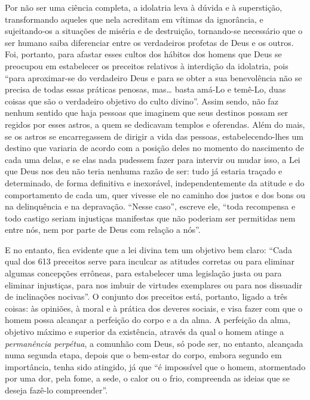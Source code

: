 Por não ser uma ciência completa, a idolatria leva à dúvida e à
superstição, transformando aqueles que nela acreditam em vítimas da
ignorância, e sujeitando-os a situações de miséria e de destruição,
tornando-se necessário que o ser humano saiba diferenciar entre os
verdadeiros profetas de Deus e os outros. Foi, portanto, para afastar
esses cultos dos hábitos dos homens que Deus se preocupou em estabelecer
os preceitos relativos à interdição da idolatria, pois ``para
aproximar-se do verdadeiro Deus e para se obter a sua benevolência não
se precisa de todas essas práticas penosas, mas\ldots{} basta amá-Lo e
temê-Lo, duas coisas que são o verdadeiro objetivo do culto divino''.
Assim sendo, não faz nenhum sentido que haja pessoas que imaginem que
seus destinos possam ser regidos por esses astros, a quem se dedicavam
templos e oferendas. Além do mais, se os astros se encarregassem de
dirigir a vida das pessoas, estabelecendo-lhes um destino que variaria
de acordo com a posição deles no momento do
nascimento de cada uma delas, e se elas nada pudessem fazer para
intervir ou mudar isso, a Lei que Deus nos deu não teria nenhuma razão
de ser: tudo já estaria traçado e determinado, de forma definitiva e
inexorável, independentemente da atitude e do comportamento de cada um,
quer vivesse ele no caminho dos justos e dos bons ou na delinquência e
na depravação. ``Nesse caso'', escreve ele, ``toda recompensa e todo
castigo seriam injustiças manifestas que não poderiam ser permitidas nem
entre nós, nem por parte de Deus com relação a nós''.

E no entanto, fica evidente que a lei divina tem um objetivo bem claro:
``Cada qual dos 613 preceitos serve para inculcar as atitudes corretas
ou para eliminar algumas concepções errôneas, para estabelecer uma
legislação justa ou para eliminar injustiças, para nos imbuir de
virtudes exemplares ou para nos dissuadir de inclinações nocivas''. O
conjunto dos preceitos está, portanto, ligado a três coisas: às
opiniões, à moral e à prática dos deveres sociais, e visa fazer com que
o homem possa alcançar a perfeição do corpo e a da alma. A perfeição da
alma, objetivo máximo e superior da existência, através da qual o homem
atinge a \emph{permanência perpétua}, a comunhão com Deus, só pode ser, no
entanto, alcançada numa segunda etapa, depois que o bem-estar do corpo,
embora segundo em importância, tenha sido atingido, já que ``é
impossível que o homem, atormentado por uma dor, pela fome, a sede, o
calor ou o frio, compreenda as ideias que se deseja fazê-lo
compreender''.

